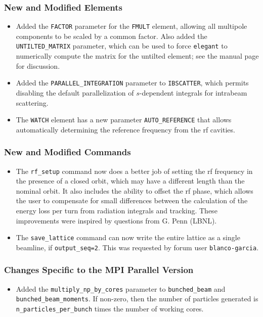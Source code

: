 \documentclass[11pt]{article}
\begin{document}
\subsubsection{New and Modified Elements}
\begin{itemize}
\item Added the \verb|FACTOR| parameter for the \verb|FMULT| element, allowing all multipole components to
  be scaled by a common factor. Also added the \verb|UNTILTED_MATRIX| parameter, which can be used to force
  \verb|elegant| to numerically compute the matrix for the untilted element; see the manual page for
  discussion.
\item Added the \verb|PARALLEL_INTEGRATION| parameter to \verb|IBSCATTER|, which permits disabling the default
  parallelization of $s$-dependent integrals for intrabeam scattering.
\item The \verb|WATCH| element has a new parameter \verb|AUTO_REFERENCE| that allows automatically determining
  the reference frequency from the rf cavities.
\end{itemize}

\subsubsection{New and Modified Commands}
\begin{itemize}
\item The \verb|rf_setup| command now does a better job of setting the rf frequency in the presence of a closed
  orbit, which may have a different length than the nominal orbit. It also includes the ability to offset the
  rf phase, which allows the user to compensate for small differences between the calculation of the energy loss per
  turn from radiation integrals and tracking. These improvements were inspired by questions from G. Penn (LBNL).
\item The \verb|save_lattice| command can now write the entire lattice as a single beamline, if \verb|output_seq=2|.
  This was requested by forum user \verb|blanco-garcia|.
\end{itemize}

\subsubsection{Changes Specific to the MPI Parallel Version}

\begin{itemize}
\item Added the \verb|multiply_np_by_cores| parameter to \verb|bunched_beam|  and \verb|bunched_beam_moments|.
  If non-zero, then the number of particles generated is \verb|n_particles_per_bunch| times the number of
  working cores.
\end{itemize}
\end{document}
